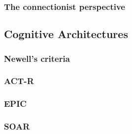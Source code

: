 \subsubsection{The connectionist perspective}

\subsection{Cognitive Architectures}

\subsubsection{Newell's criteria}

\subsubsection{ACT-R}

\subsubsection{EPIC}

\subsubsection{SOAR} 
\label{ClassicalPerspective}
   